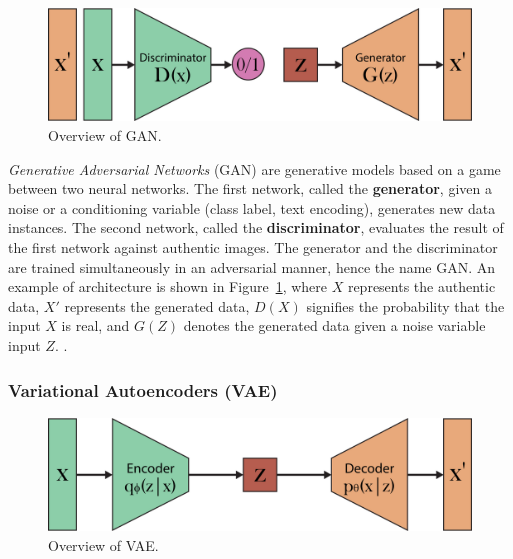 \documentclass[preprint]{elsarticle}
\begin{document}
\begin{figure}[b]
	\centering
    \includegraphics[scale=0.8]{img/svg/GAN.png}
	\caption{Overview of GAN.}\label{fig:gan}
\end{figure}

\emph{Generative Adversarial Networks} (GAN) \cite{goodfellow2014generative} are generative models based on a game between two neural networks. 
The first network, called the \textbf{generator}, given a noise or a conditioning variable (class label, text encoding), generates new data instances. 
The second network, called the \textbf{discriminator}, evaluates the result of the first network against authentic images.
The generator and the discriminator are trained simultaneously in an adversarial manner, hence the name GAN. An example of architecture is shown in Figure~\ref{fig:gan}, where $X$ represents the authentic data, $X'$ represents the generated data, $D(X)$ signifies the probability that the input $X$ is real, and $G(Z)$ denotes the generated data given a noise variable input $Z$.
\cite{weng2019gan}.

\subsubsection{Variational Autoencoders (VAE)} \label{sec:vae}

\begin{figure}[t]
	\centering
    \includegraphics[scale=0.8]{img/svg/VAE.png}
    \caption{Overview of VAE.}\label{fig:vae}
\end{figure}
\end{document}
